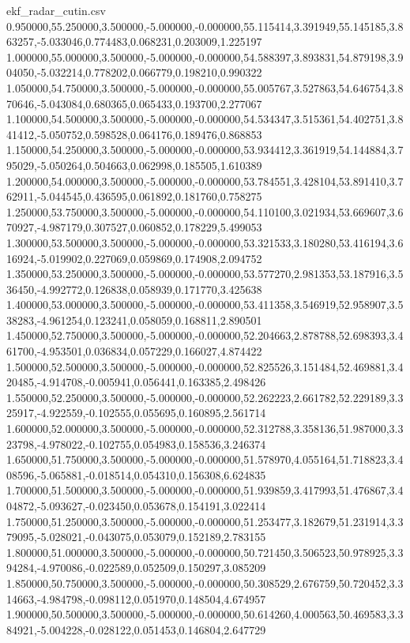 \begin{filecontents*}[overwrite]{ekf_radar_cutin.csv}
0.950000,55.250000,3.500000,-5.000000,-0.000000,55.115414,3.391949,55.145185,3.863257,-5.033046,0.774483,0.068231,0.203009,1.225197
1.000000,55.000000,3.500000,-5.000000,-0.000000,54.588397,3.893831,54.879198,3.904050,-5.032214,0.778202,0.066779,0.198210,0.990322
1.050000,54.750000,3.500000,-5.000000,-0.000000,55.005767,3.527863,54.646754,3.870646,-5.043084,0.680365,0.065433,0.193700,2.277067
1.100000,54.500000,3.500000,-5.000000,-0.000000,54.534347,3.515361,54.402751,3.841412,-5.050752,0.598528,0.064176,0.189476,0.868853
1.150000,54.250000,3.500000,-5.000000,-0.000000,53.934412,3.361919,54.144884,3.795029,-5.050264,0.504663,0.062998,0.185505,1.610389
1.200000,54.000000,3.500000,-5.000000,-0.000000,53.784551,3.428104,53.891410,3.762911,-5.044545,0.436595,0.061892,0.181760,0.758275
1.250000,53.750000,3.500000,-5.000000,-0.000000,54.110100,3.021934,53.669607,3.670927,-4.987179,0.307527,0.060852,0.178229,5.499053
1.300000,53.500000,3.500000,-5.000000,-0.000000,53.321533,3.180280,53.416194,3.616924,-5.019902,0.227069,0.059869,0.174908,2.094752
1.350000,53.250000,3.500000,-5.000000,-0.000000,53.577270,2.981353,53.187916,3.536450,-4.992772,0.126838,0.058939,0.171770,3.425638
1.400000,53.000000,3.500000,-5.000000,-0.000000,53.411358,3.546919,52.958907,3.538283,-4.961254,0.123241,0.058059,0.168811,2.890501
1.450000,52.750000,3.500000,-5.000000,-0.000000,52.204663,2.878788,52.698393,3.461700,-4.953501,0.036834,0.057229,0.166027,4.874422
1.500000,52.500000,3.500000,-5.000000,-0.000000,52.825526,3.151484,52.469881,3.420485,-4.914708,-0.005941,0.056441,0.163385,2.498426
1.550000,52.250000,3.500000,-5.000000,-0.000000,52.262223,2.661782,52.229189,3.325917,-4.922559,-0.102555,0.055695,0.160895,2.561714
1.600000,52.000000,3.500000,-5.000000,-0.000000,52.312788,3.358136,51.987000,3.323798,-4.978022,-0.102755,0.054983,0.158536,3.246374
1.650000,51.750000,3.500000,-5.000000,-0.000000,51.578970,4.055164,51.718823,3.408596,-5.065881,-0.018514,0.054310,0.156308,6.624835
1.700000,51.500000,3.500000,-5.000000,-0.000000,51.939859,3.417993,51.476867,3.404872,-5.093627,-0.023450,0.053678,0.154191,3.022414
1.750000,51.250000,3.500000,-5.000000,-0.000000,51.253477,3.182679,51.231914,3.379095,-5.028021,-0.043075,0.053079,0.152189,2.783155
1.800000,51.000000,3.500000,-5.000000,-0.000000,50.721450,3.506523,50.978925,3.394284,-4.970086,-0.022589,0.052509,0.150297,3.085209
1.850000,50.750000,3.500000,-5.000000,-0.000000,50.308529,2.676759,50.720452,3.314663,-4.984798,-0.098112,0.051970,0.148504,4.674957
1.900000,50.500000,3.500000,-5.000000,-0.000000,50.614260,4.000563,50.469583,3.384921,-5.004228,-0.028122,0.051453,0.146804,2.647729

\end{filecontents*}
